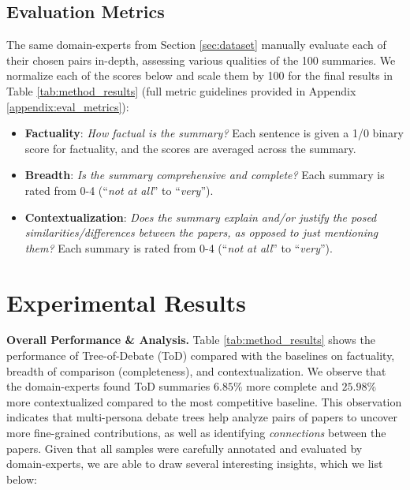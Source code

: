 \subsection{Evaluation Metrics}
\par The same domain-experts from Section \ref{sec:dataset} manually evaluate each of their chosen pairs in-depth, assessing various qualities of the 100 summaries. We normalize each of the scores below and scale them by 100 for the final results in Table \ref{tab:method_results} (full metric guidelines provided in Appendix \ref{appendix:eval_metrics}):
\begin{itemize}[leftmargin=*]
    \itemsep-0.3em
    \item \textbf{Factuality}: \textit{How factual is the summary?} Each sentence is given a 1/0 binary score for factuality, and the scores are averaged across the summary.
    \item \textbf{Breadth}: \textit{Is the summary comprehensive and complete?} Each summary is rated from 0-4 (``\textit{not at all}'' to ``\textit{very}'').
    \item \textbf{Contextualization}: 
    \textit{Does the summary explain and/or justify the posed similarities/differences between the papers, as opposed to just mentioning them?} Each summary is rated from 0-4 (``\textit{not at all}'' to ``\textit{very}'').
    \vspace{-0.5em}
\end{itemize}



\section{Experimental Results}

\par{\textbf{Overall Performance \& Analysis.}} Table \ref{tab:method_results} shows the performance of Tree-of-Debate (ToD) compared with the baselines on factuality, breadth of comparison (completeness), and contextualization. We observe that the domain-experts found ToD summaries $6.85\%$ more complete and $25.98\%$ more contextualized compared to the most competitive baseline. This observation indicates that multi-persona debate trees help analyze pairs of papers to uncover more fine-grained contributions, as well as identifying \textit{connections} between the papers. Given that all samples were carefully annotated and evaluated by domain-experts, we are able to draw several interesting insights, which we list below:

